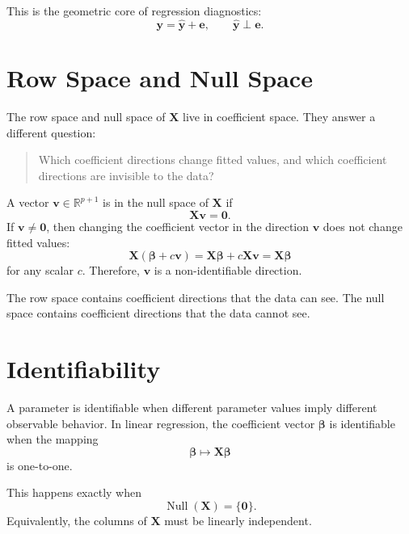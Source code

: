 This is the geometric core of regression diagnostics:
\begin{equation}
  \mathbf{y}=\widehat{\mathbf{y}}+\mathbf{e},
  \qquad
  \widehat{\mathbf{y}}\perp \mathbf{e}.
\end{equation}

\section{Row Space and Null Space}

The row space and null space of \(\mathbf{X}\) live in coefficient space.  They answer a different question:
\begin{quote}
  Which coefficient directions change fitted values, and which coefficient directions are invisible to the data?
\end{quote}

A vector \(\mathbf{v}\in\mathbb{R}^{p+1}\) is in the null space of \(\mathbf{X}\) if
\begin{equation}
  \mathbf{X}\mathbf{v}=\mathbf{0}.
\end{equation}
If \(\mathbf{v}\ne\mathbf{0}\), then changing the coefficient vector in the direction \(\mathbf{v}\) does not change fitted values:
\begin{equation}
  \mathbf{X}(\boldsymbol{\beta}+c\mathbf{v})
  =\mathbf{X}\boldsymbol{\beta}+c\mathbf{X}\mathbf{v}
  =\mathbf{X}\boldsymbol{\beta}
\end{equation}
for any scalar \(c\).  Therefore, \(\mathbf{v}\) is a non-identifiable direction.

The row space contains coefficient directions that the data can see.  The null space contains coefficient directions that the data cannot see.

\section{Identifiability}

A parameter is identifiable when different parameter values imply different observable behavior.  In linear regression, the coefficient vector \(\boldsymbol{\beta}\) is identifiable when the mapping
\begin{equation}
  \boldsymbol{\beta}\mapsto \mathbf{X}\boldsymbol{\beta}
\end{equation}
is one-to-one.

This happens exactly when
\begin{equation}
  \operatorname{Null}(\mathbf{X})=\{\mathbf{0}\}.
\end{equation}
Equivalently, the columns of \(\mathbf{X}\) must be linearly independent.

